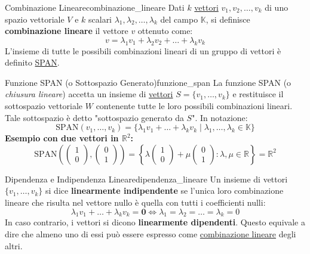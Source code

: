 \documentclass{article}
\begin{document}
\begin{definition}{Combinazione Lineare}{combinazione_lineare}
    Dati $k$ \hyperref[def:vettore]{vettori} $v_1, v_2, \dots, v_k$ di uno spazio vettoriale $V$ e $k$ scalari $\lambda_1, \lambda_2, \dots, \lambda_k$ del campo $\mathbb{K}$, si definisce \textbf{combinazione lineare} il vettore $v$ ottenuto come:
    \[ v = \lambda_1 v_1 + \lambda_2 v_2 + \dots + \lambda_k v_k \]
    L'insieme di tutte le possibili combinazioni lineari di un gruppo di vettori è definito \hyperref[def:funzione_span]{SPAN}.
\end{definition}

\begin{definition}{Funzione SPAN (o Sottospazio Generato)}{funzione_span}
    La funzione SPAN (o \textit{chiusura lineare}) accetta un insieme di \hyperref[def:vettore]{vettori} $S = \{v_1, \dots, v_k\}$ e restituisce il sottospazio vettoriale $W$ contenente tutte le loro possibili combinazioni lineari.
    Tale sottospazio è detto "sottospazio generato da $S$".
    In notazione:
    \[ \text{SPAN}(v_1, \dots, v_k) = \{ \lambda_1 v_1 + \dots + \lambda_k v_k \mid \lambda_1, \dots, \lambda_k \in \mathbb{K} \} \]
    \textbf{Esempio con due vettori in $\mathbb{R}^2$:}
    \[ \text{SPAN}\left(\begin{pmatrix} 1 \\ 0 \end{pmatrix}, \begin{pmatrix} 0 \\ 1 \end{pmatrix}\right) = \left\{ \lambda\begin{pmatrix} 1 \\ 0 \end{pmatrix} + \mu\begin{pmatrix} 0 \\ 1 \end{pmatrix} : \lambda, \mu \in \mathbb{R}\right\} = \mathbb{R}^2 \]
\end{definition}

\begin{definition}{Dipendenza e Indipendenza Lineare}{dipendenza_lineare}
    Un insieme di vettori $\{v_1, \dots, v_k\}$ si dice \textbf{linearmente indipendente} se l'unica loro combinazione lineare che risulta nel vettore nullo è quella con tutti i coefficienti nulli:
    \[ \lambda_1 v_1 + \dots + \lambda_k v_k = \mathbf{0} \iff \lambda_1 = \lambda_2 = \dots = \lambda_k = 0 \]
    In caso contrario, i vettori si dicono \textbf{linearmente dipendenti}.
    Questo equivale a dire che almeno uno di essi può essere espresso come \hyperref[def:combinazione_lineare]{combinazione lineare} degli altri.
\end{definition}
\end{document}
